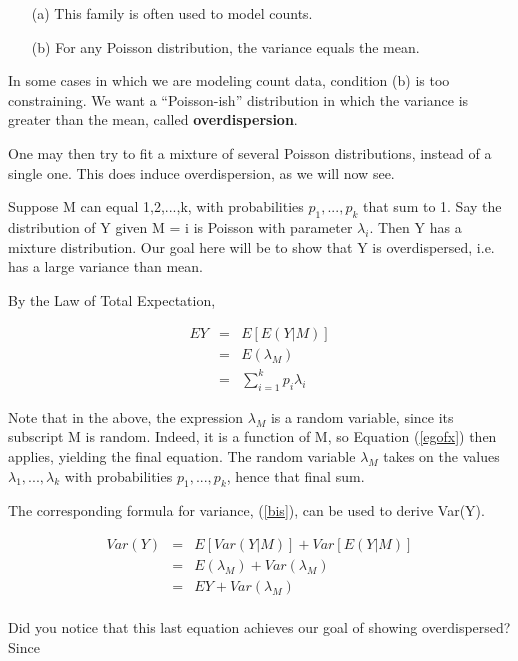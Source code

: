 \documentclass[11pt]{article}
\begin{document}
\begin{itemize}

\item [(a)] This family is often used to model counts.

\item [(b)] For any Poisson distribution, the variance equals the mean.

\end{itemize}

In some cases in which we are modeling count data, condition (b) is too
constraining.  We want a ``Poisson-ish''
distribution in which the variance is greater
than the mean, called {\bf overdispersion}.  

One may then try to fit a mixture of several Poisson distributions,
instead of a single one.  This does induce overdispersion, as we will
now see.  

Suppose M can equal 1,2,...,k, with probabilities $p_1,...,p_k$ that sum
to 1.  Say the distribution of Y given M = i is Poisson with parameter
$\lambda_i$.  Then Y has a mixture distribution.  Our goal here will be
to show that Y is overdispersed, i.e. has a large variance than mean.

By the Law of Total Expectation,

\begin{eqnarray}
\label{meanlamb}
EY &=& E[E(Y|M)] \\ 
&=& E(\lambda_M) \label{elambm} \\
&=& \sum_{i=1}^k p_i \lambda_i
\end{eqnarray}

Note that in the above, the expression $\lambda_M$ is a random variable,
since its subscript M is random.  Indeed, it is a function of M, so
Equation (\ref{egofx}) then applies, yielding the final equation.  The
random variable $\lambda_M$ takes on the values $\lambda_1,...,\lambda_k$
with probabilities $p_1,...,p_k$, hence that final sum.

The corresponding formula for variance, (\ref{bis}), can be used to
derive Var(Y).

\begin{eqnarray}
Var(Y) &=& E[Var(Y|M)] + Var[E(Y|M)] \\ 
&=& E(\lambda_M) + Var(\lambda_M) \label{thislast} \\
&=& EY + Var(\lambda_M) \label{thislast} \\
\end{eqnarray}

Did you notice that this last equation achieves our goal of showing
overdispersed?  Since
\end{document}
